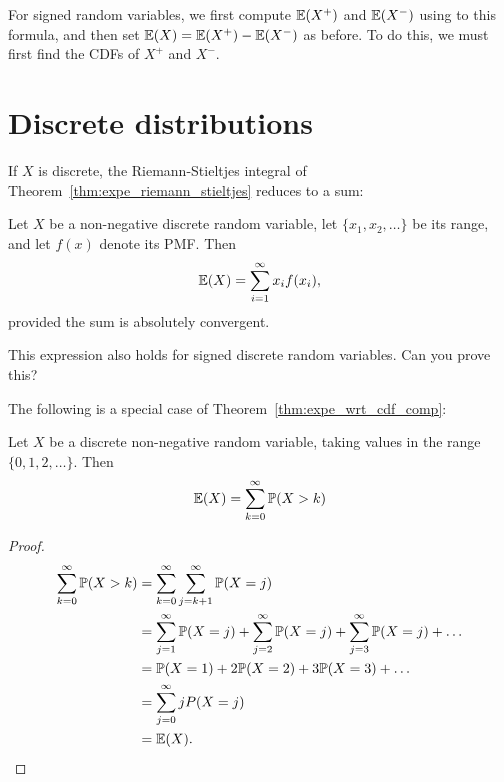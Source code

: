 \bigskip
For signed random variables, we first compute $\mathbb{E}(X^{+})$ and $\mathbb{E}(X^{-})$ using to this formula, and then set $\mathbb{E}(X)=\mathbb{E}(X^{+})-\mathbb{E}(X^{-})$ as before. To do this, we must first find the CDFs of $X^{+}$ and $X^{-}$.
\newpage
\section{Discrete distributions}
If $X$ is discrete, the Riemann-Stieltjes integral of Theorem~\ref{thm:expe_riemann_stieltjes} reduces to a sum:

\begin{theorem}\label{thm:expe_wrt_discrete_dist}
Let $X$ be a non-negative discrete random variable, let $\{x_1,x_2,\ldots\}$ be its range, and let $f(x)$ denote its PMF. Then
\[
\expe(X) = \sum_{i=1}^{\infty} x_i f(x_i), %
\]
provided the sum is absolutely convergent.
\end{theorem}
\proofomitted
\begin{remark}
This expression also holds for signed discrete random variables. Can you prove this?
\end{remark}

The following is a special case of Theorem~\ref{thm:expe_wrt_cdf_comp}:
\begin{theorem}\label{thm:expe_disc_pos}
Let $X$ be a discrete non-negative random variable, taking values in the range $\{0,1,2,\ldots\}$. Then
\[
\mathbb{E}(X) = \sum_{k=0}^{\infty} \mathbb{P}(X > k)
\]
\end{theorem}

\begin{proof}
\begin{align*}
\sum_{k=0}^{\infty} \mathbb{P}(X > k)
	& = \sum_{k=0}^{\infty} \sum_{j=k+1}^{\infty} \mathbb{P}(X = j) \\
	& = \sum_{j=1}^{\infty} \mathbb{P}(X=j) + \sum_{j=2}^{\infty} \mathbb{P}(X=j) + \sum_{j=3}^{\infty} \mathbb{P}(X=j) + \ldots \\
	& = \mathbb{P}(X=1) + 2\mathbb{P}(X=2) + 3\mathbb{P}(X=3) + \ldots \\
	& = \sum_{j=0}^{\infty} j P(X=j) \\
	& = \mathbb{E}(X).
\end{align*}	
\vspace{-4ex}
\end{proof}

